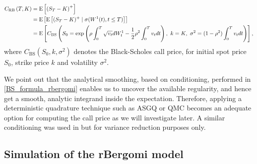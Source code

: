 \begin{align}\label{BS_formula_rbergomi}
	C_{\text{RB}}\left( T, K \right) &= \text{E}\left[ \left(S_T - K \right)^+ \right]  \nonumber\\
	&=\mathrm{E}\left[\mathrm{E}\left[(S_T-K)^+ \mid \sigma(W^1(t) ,t \le T)\right]\right]\nonumber \\
	&=\text{E}\left[C_{\text{BS}}\left( S_0 = \operatorname{exp}\left(\rho \int_0^T \sqrt{v_t} dW_t^1 - \frac{1}{2}
	\rho^2 \int_0^T v_t dt\right),\ k = K, \ \sigma^2 = (1-\rho^2)
	\int_0^T v_t dt \right) \right],
\end{align}
where $C_{\text{BS}}(S_0,k,\sigma^2)$ denotes the Black-Scholes call price, for initial spot price $S_0$, strike price $k$ and volatility $\sigma^2$.


We point out that the analytical smoothing, based on conditioning, performed in \eqref{BS_formula_rbergomi} enables us to uncover the available regularity, and hence  get a smooth, analytic integrand inside the expectation. Therefore, applying a deterministic quadrature technique such as ASGQ or QMC becomes an adequate option for computing the call price as we will investigate later. A similar conditioning was used in \cite{mccrickerd2018turbocharging} but for variance reduction purposes only.

\subsection{Simulation of the rBergomi model}\label{sec:Simulation of the rBergomi model}

